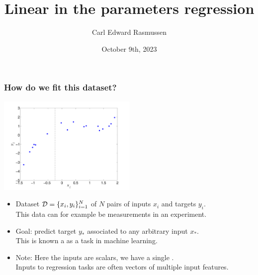 

\title{Linear in the parameters regression}
\author{Carl Edward Rasmussen}
\date{October 9th, 2023}



\begin{frame}
\titlepage
\end{frame}

\begin{frame}
\frametitle{How do we fit this dataset?}

\centerline{\includegraphics[width=0.5\textwidth]{toy_data.pdf}}

\vfill

\begin{itemize}
\item Dataset ${\cal D}=\{x_i,y_i\}_{i=1}^N$ of $N$ pairs of inputs 
$x_i$ and  targets $y_i$.\\ This data can for example be
measurements in an experiment.
\item Goal: predict target $y_*$ associated to any arbitrary input 
$x_*$.\\ This is known a as a  task in machine learning.
\item Note: Here the inputs are scalars, we have a single .\\ 
Inputs to regression tasks are often vectors of multiple input features.
\end{itemize}
\end{frame}


